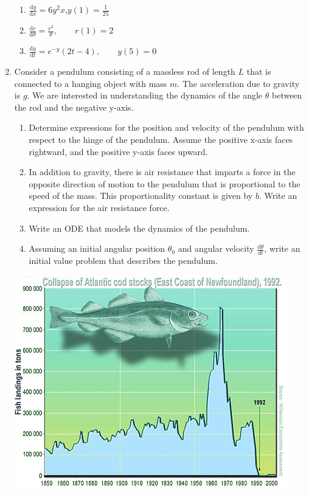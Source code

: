\begin{enumerate}
\begin{enumerate}
    \item $\frac{\mathrm d y}{\mathrm d x} = 6y^2x$,\qquad $y(1) = \frac{1}{25}$

    \item $\frac{\mathrm d r}{\mathrm d \theta} = \frac{r^2}{\theta},\qquad r(1) = 2 $  

    \item $\frac{\mathrm d y}{\mathrm d t} = e^{-y}(2t-4),\qquad y(5)=0$ 
\end{enumerate}

\item Consider a pendulum consisting of a massless rod of length $L$ that is connected to a hanging object with mass $m$. The acceleration due to gravity is $g$. We are interested in understanding the dynamics of the angle $\theta$ between the rod and the negative y-axis.
\begin{enumerate}
    \item Determine expressions for the position and velocity of the pendulum with respect to the hinge of the pendulum. Assume the positive x-axis faces rightward, and the positive y-axis faces upward.

    \item In addition to gravity, there is air resistance that imparts a force in the opposite direction of motion to the pendulum that is proportional to the speed of the mass. This proportionality constant is given by $b$. Write an expression for the air resistance force.

    \item Write an ODE that models the dynamics of the pendulum.

    \item Assuming an initial angular position $\theta_0$ and angular velocity $\frac{\mathrm d\theta}{dt}$, write an initial value problem that describes the pendulum.
\end{enumerate}

\clearpage
\centering 
\includegraphics[scale=2]{fish.jpeg}


\end{enumerate}
